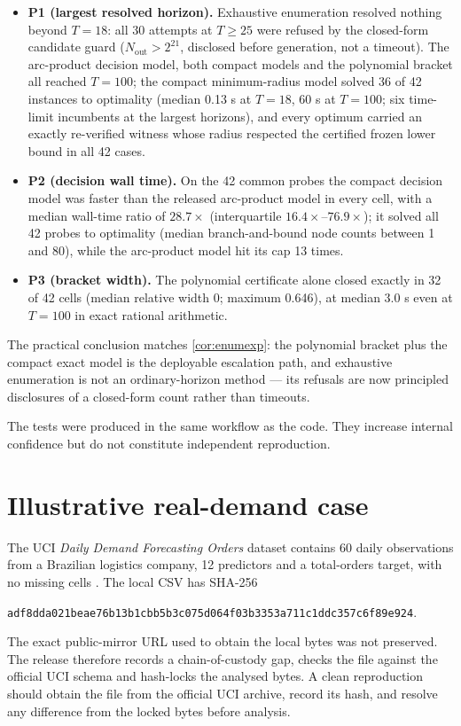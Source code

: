 \documentclass[11pt]{article}
\theoremstyle{definition}
\begin{document}
\begin{itemize}
\item \textbf{P1 (largest resolved horizon).} Exhaustive enumeration
resolved nothing beyond $T=18$: all 30 attempts at $T\ge25$ were refused
by the closed-form candidate guard ($N_{\mathrm{out}}>2^{21}$, disclosed
before generation, not a timeout). The arc-product decision model, both
compact models and the polynomial bracket all reached $T=100$; the
compact minimum-radius model solved 36 of 42 instances to optimality
(median 0.13 s at $T=18$, 60 s at $T=100$; six time-limit incumbents at
the largest horizons), and every optimum carried an exactly re-verified
witness whose radius respected the certified frozen lower bound in all
42 cases.
\item \textbf{P2 (decision wall time).} On the 42 common probes the
compact decision model was faster than the released arc-product model in
every cell, with a median wall-time ratio of $28.7\times$ (interquartile
$16.4\times$--$76.9\times$); it solved all 42 probes to optimality
(median branch-and-bound node counts between 1 and 80), while the
arc-product model hit its cap 13 times.
\item \textbf{P3 (bracket width).} The polynomial certificate alone
closed exactly in 32 of 42 cells (median relative width 0; maximum
0.646), at median 3.0 s even at $T=100$ in exact rational arithmetic.
\end{itemize}

The practical conclusion matches \cref{cor:enumexp}: the polynomial
bracket plus the compact exact model is the deployable escalation path,
and exhaustive enumeration is not an ordinary-horizon method --- its
refusals are now principled disclosures of a closed-form count rather
than timeouts.

The tests were produced in the same workflow as the code. They increase internal confidence but do not constitute independent reproduction.

\section{Illustrative real-demand case}\label{sec:case}

The UCI \emph{Daily Demand Forecasting Orders} dataset contains 60 daily observations from a Brazilian logistics company, 12 predictors and a total-orders target, with no missing cells \parencite{UCIDailyDemand2016}. The local CSV has SHA-256
\begin{center}
\texttt{adf8dda021beae76b13b1cbb5b3c075d064f03b3353a711c1ddc357c6f89e924}.
\end{center}
The exact public-mirror URL used to obtain the local bytes was not preserved. The release therefore records a chain-of-custody gap, checks the file against the official UCI schema and hash-locks the analysed bytes. A clean reproduction should obtain the file from the official UCI archive, record its hash, and resolve any difference from the locked bytes before analysis.
\end{document}
